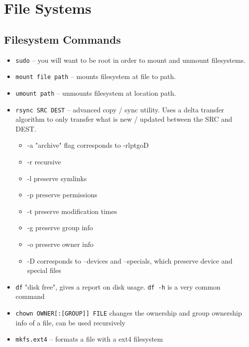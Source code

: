 

\section{File Systems}
\subsection{Filesystem Commands}
\begin{itemize}
	\item \texttt{sudo} -- you will want to be root in order to mount and unmount filesystems.
	\item \texttt{mount file path} -- mounts filesystem at file to path. 
	\item \texttt{umount path} -- unmounts filesystem at location path.
	\item \texttt{rsync SRC DEST} -- advanced copy / sync utility. Uses a delta transfer algorithm to only transfer what is new / updated between the SRC and DEST. 
	\begin{itemize}
		\item -a "archive" flag corresponds to -rlptgoD
		\item -r recursive
		\item -l preserve symlinks
		\item -p preserve permissions
		\item -t preserve modification times
		\item -g preserve group info
		\item -o preserve owner info
		\item -D corresponds to --devices and --specials, which preserve device and special files  
	\end{itemize}
	\item \texttt{df} "disk free", gives a report on disk usage. \texttt{df -h} is a very common command
	\item \texttt{chown OWNER[:[GROUP]] FILE} changes the ownership and group ownership info of a file, can be used recursively
	\item \texttt{mkfs.ext4} -- formats a file with a ext4 filesystem
\end{itemize}

